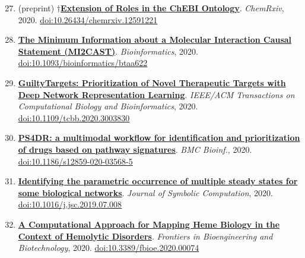 \documentclass[10pt,a4paper,sans]{moderncv} %
\newcommand{\wikidata}[2]{\href{https://bioregistry.io/wikidata:#1?provider=scholia}{{#2}}}
\begin{document}
    \begin{enumerate}
    \setcounter{enumi}{26}
    \itemsep0.5em
        \item
        (preprint) $\dagger$\wikidata{Q96909013}{\textbf{Extension of Roles in the ChEBI Ontology}}.
    \textit{ChemRxiv}, 2020.  {\scriptsize \href{https://bioregistry.io/doi:10.26434/CHEMRXIV.12591221}{doi:10.26434/chemrxiv.12591221}}
        \item
        \wikidata{Q97063807}{\textbf{The Minimum Information about a Molecular Interaction Causal Statement (MI2CAST)}}.
    \textit{Bioinformatics}, 2020.  {\scriptsize \href{https://bioregistry.io/doi:10.1093/BIOINFORMATICS/BTAA622}{doi:10.1093/bioinformatics/btaa622}}
        \item
        \wikidata{Q98200725}{\textbf{GuiltyTargets: Prioritization of Novel Therapeutic Targets with Deep Network Representation Learning}}.
    \textit{IEEE/ACM Transactions on Computational Biology and Bioinformatics}, 2020.  {\scriptsize \href{https://bioregistry.io/doi:10.1109/TCBB.2020.3003830}{doi:10.1109/tcbb.2020.3003830}}
        \item
        \wikidata{Q96169295}{\textbf{PS4DR: a multimodal workflow for identification and prioritization of drugs based on pathway signatures}}.
    \textit{BMC Bioinf.}, 2020.  {\scriptsize \href{https://bioregistry.io/doi:10.1186/S12859-020-03568-5}{doi:10.1186/s12859-020-03568-5}}
        \item
        \wikidata{Q118952373}{\textbf{Identifying the parametric occurrence of multiple steady states for some biological networks}}.
    \textit{Journal of Symbolic Computation}, 2020.  {\scriptsize \href{https://bioregistry.io/doi:10.1016/J.JSC.2019.07.008}{doi:10.1016/j.jsc.2019.07.008}}
        \item
        \wikidata{Q90643177}{\textbf{A Computational Approach for Mapping Heme Biology in the Context of Hemolytic Disorders}}.
    \textit{Frontiers in Bioengineering and Biotechnology}, 2020.  {\scriptsize \href{https://bioregistry.io/doi:10.3389/FBIOE.2020.00074}{doi:10.3389/fbioe.2020.00074}}
    \end{enumerate}
\end{document}
